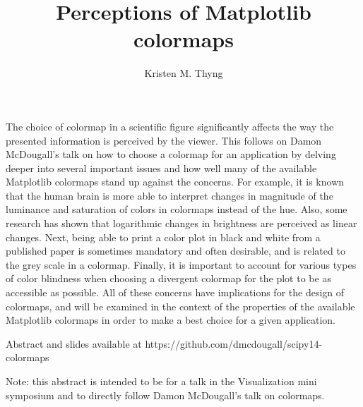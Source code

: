 \documentclass[11pt]{article}
\title{Perceptions of Matplotlib colormaps}
\author{Kristen M. Thyng}
\date{}
\begin{document}
\maketitle

The choice of colormap in a scientific figure significantly affects the way the presented information is perceived by the viewer. This follows on Damon McDougall's talk on how to choose a colormap for an application by delving deeper into several important issues and how well many of the available Matplotlib colormaps stand up against the concerns. For example, it is known that the human brain is more able to interpret changes in magnitude of the luminance and saturation of colors in colormaps instead of the hue. Also, some research has shown that logarithmic changes in brightness are perceived as linear changes. Next, being able to print a color plot in black and white from a published paper is sometimes mandatory and often desirable, and is related to the grey scale in a colormap. Finally, it is important to account for various types of color blindness when choosing a divergent colormap for the plot to be as accessible as possible. All of these concerns have implications for the design of colormaps, and will be examined in the context of the properties of the available Matplotlib colormaps in order to make a best choice for a given application.

Abstract and slides available at https://github.com/dmcdougall/scipy14-colormaps

Note: this abstract is intended to be for a talk in the Visualization mini symposium and to directly follow Damon McDougall's talk on colormaps.
\end{document}
